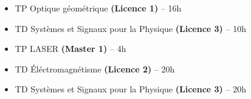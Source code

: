 \documentclass[9pt,a4paper,academicons]{altacv}
\begin{document}
\begin{fullwidth}





	\begin{itemize}
		\item TP Optique géométrique \textbf{(Licence 1)} -- 16h
		\item TD Systèmes et Signaux pour la Physique \textbf{(Licence 3)} -- 10h

	\end{itemize}

\divider


\begin{itemize}
	\item TP LASER \textbf{(Master 1)} -- 4h
	\item TD \'Eléctromagnétisme \textbf{(Licence 2)} -- 20h
	\item TD Systèmes et Signaux pour la Physique \textbf{(Licence 3)} -- 20h
	
\end{itemize}
\divider
\end{fullwidth}
\end{document}
